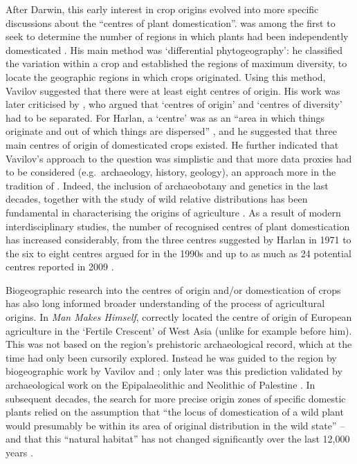 \documentclass[
  authoryear,
  preprint]{elsarticle}
\begin{document}
After Darwin, this early interest in crop origins evolved into more
specific discussions about the ``centres of plant domestication''.
\citet{Vavilov1926} was among the first to seek to determine the number
of regions in which plants had been independently domesticated
\citep{Harris1990}. His main method was `differential phytogeography':
he classified the variation within a crop and established the regions of
maximum diversity, to locate the geographic regions in which crops
originated. Using this method, Vavilov suggested that there were at
least eight centres of origin. His work was later criticised by
\citet{Harlan1971}, who argued that `centres of origin' and `centres of
diversity' had to be separated. For Harlan, a `centre' was as an ``area
in which things originate and out of which things are dispersed''
\citep[p.~468]{Harlan1971}, and he suggested that three main centres of
origin of domesticated crops existed. He further indicated that
Vavilov's approach to the question was simplistic and that more data
proxies had to be considered (e.g.~archaeology, history, geology), an
approach more in the tradition of \citet{Candolle1886}. Indeed, the
inclusion of archaeobotany and genetics in the last decades, together
with the study of wild relative distributions has been fundamental in
characterising the origins of agriculture \citep{FullerColledge2008}. As
a result of modern interdisciplinary studies, the number of recognised
centres of plant domestication has increased considerably, from the
three centres suggested by Harlan in 1971 to the six to eight centres
argued for in the 1990s \citep{Smith1995} and up to as much as 24
potential centres reported in 2009
\citetext{\citealp{PuruggananFuller2009}; \citealp[see
also][]{Fuller2010}}.

Biogeographic research into the centres of origin and/or domestication
of crops has also long informed broader understanding of the process of
agricultural origins. In \emph{Man Makes Himself}, \citet{Childe1936}
correctly located the centre of origin of European agriculture in the
`Fertile Crescent' of West Asia (unlike for example \citet{Pumpelly1908}
before him). This was not based on the region's prehistoric
archaeological record, which at the time had only been cursorily
explored. Instead he was guided to the region by biogeographic work by
Vavilov and \citet{PeakeFleure1927}; only later was this prediction
validated by archaeological work on the Epipalaeolithic and Neolithic of
Palestine \citep{Boyd2018}. In subsequent decades, the search for more
precise origin zones of specific domestic plants relied on the
assumption that ``the locus of domestication of a wild plant would
presumably be within its area of original distribution in the wild
state''
\citetext{\citealp{Butzer1971}; \citealp[paraphrasing][]{Helbaek1959}}
-- and that this ``natural habitat'' has not changed significantly over
the last 12,000 years \citep{Butzer1971}.
\end{document}
